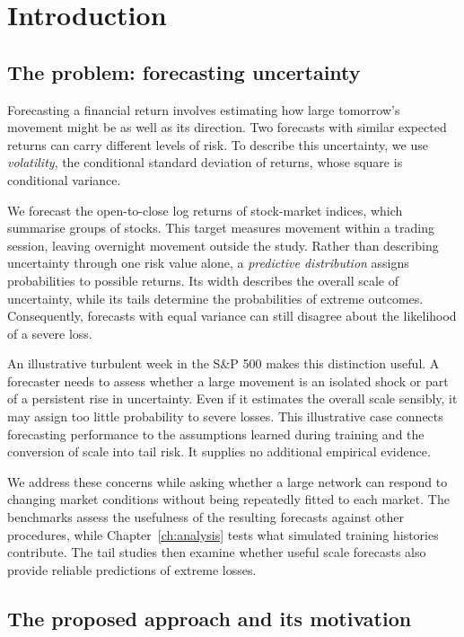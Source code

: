 \chapter{Introduction}
\label{ch:introduction}

\section{The problem: forecasting uncertainty}

Forecasting a financial return involves estimating how large tomorrow's movement might be as well as its direction. Two forecasts with similar expected returns can carry different levels of risk. To describe this uncertainty, we use \emph{volatility}, the conditional standard deviation of returns, whose square is conditional variance.

We forecast the open-to-close log returns of stock-market indices, which summarise groups of stocks. This target measures movement within a trading session, leaving overnight movement outside the study. Rather than describing uncertainty through one risk value alone, a \emph{predictive distribution} assigns probabilities to possible returns. Its width describes the overall scale of uncertainty, while its tails determine the probabilities of extreme outcomes. Consequently, forecasts with equal variance can still disagree about the likelihood of a severe loss.

An illustrative turbulent week in the S\&P 500 makes this distinction useful. A forecaster needs to assess whether a large movement is an isolated shock or part of a persistent rise in uncertainty. Even if it estimates the overall scale sensibly, it may assign too little probability to severe losses. This illustrative case connects forecasting performance to the assumptions learned during training and the conversion of scale into tail risk. It supplies no additional empirical evidence.

We address these concerns while asking whether a large network can respond to changing market conditions without being repeatedly fitted to each market. The benchmarks assess the usefulness of the resulting forecasts against other procedures, while Chapter~\ref{ch:analysis} tests what simulated training histories contribute. The tail studies then examine whether useful scale forecasts also provide reliable predictions of extreme losses.

\section{The proposed approach and its motivation}

